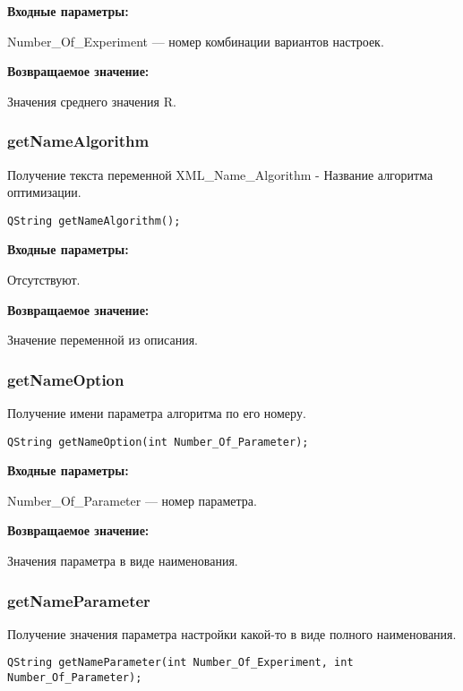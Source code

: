 \documentclass[a4paper,12pt]{article}
\begin{document}
\textbf{Входные параметры:}

Number\_Of\_Experiment --- номер комбинации вариантов настроек.

\textbf{Возвращаемое значение:}

Значения среднего значения R.


\subsubsection{getNameAlgorithm}\label{getNameAlgorithm}

Получение текста переменной  XML\_Name\_Algorithm - Название алгоритма оптимизации.


\begin{lstlisting}[label=code_syntax_getNameAlgorithm,caption=Синтаксис]
QString getNameAlgorithm();
\end{lstlisting}

\textbf{Входные параметры:}

Отсутствуют.

\textbf{Возвращаемое значение:}

Значение переменной из описания.


\subsubsection{getNameOption}\label{getNameOption}

Получение имени параметра алгоритма по его номеру.


\begin{lstlisting}[label=code_syntax_getNameOption,caption=Синтаксис]
QString getNameOption(int Number_Of_Parameter);
\end{lstlisting}

\textbf{Входные параметры:}

Number\_Of\_Parameter --- номер параметра.

\textbf{Возвращаемое значение:}

Значения параметра в виде наименования.


\subsubsection{getNameParameter}\label{getNameParameter}

Получение значения параметра настройки какой-то в виде полного наименования.


\begin{lstlisting}[label=code_syntax_getNameParameter,caption=Синтаксис]
QString getNameParameter(int Number_Of_Experiment, int Number_Of_Parameter);
\end{lstlisting}
\end{document}
